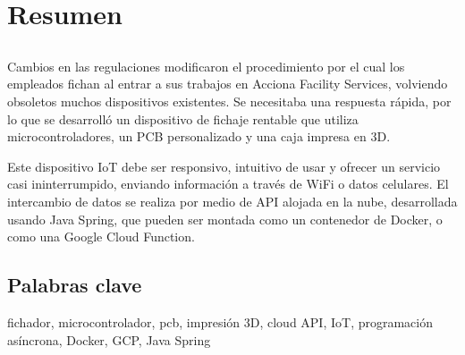 \chapter*{Resumen}

\section*{\tituloPortadaVal}

Cambios en las regulaciones modificaron el procedimiento por el cual los empleados fichan al entrar a sus trabajos en Acciona 
Facility Services, volviendo obsoletos muchos dispositivos existentes. Se necesitaba una respuesta rápida, por lo que se desarrolló 
un dispositivo de fichaje rentable que utiliza microcontroladores, un PCB personalizado y una caja impresa en 3D.

Este dispositivo IoT debe ser responsivo, intuitivo de usar y ofrecer un servicio casi ininterrumpido, enviando información a través
de WiFi o datos celulares. El intercambio de datos se realiza por medio de API alojada en la nube, desarrollada usando Java Spring,
que pueden ser montada como un contenedor de Docker, o como una Google Cloud Function.

\section*{Palabras clave}
   
\noindent fichador, microcontrolador, pcb, impresión 3D, cloud API, IoT, programación asíncrona, Docker, GCP, Java Spring

   


